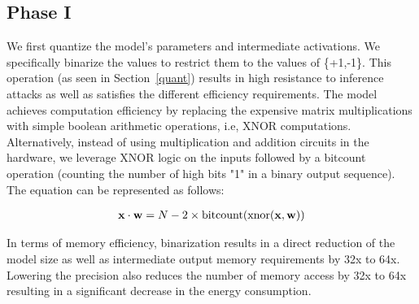 





\subsection{Phase I}
\label{p1}

We first quantize the model's parameters and intermediate activations. 
We specifically binarize the values to restrict them to the values of \{+1,-1\}.
This operation (as seen in Section~\ref{quant}) results in high resistance to inference attacks as well as satisfies the different efficiency requirements.
The model achieves computation efficiency by replacing the expensive matrix multiplications with simple boolean arithmetic operations, i.e, XNOR computations.
Alternatively, instead of using multiplication and addition circuits in the hardware, we leverage XNOR logic on the inputs followed by a bitcount operation (counting the number of high bits "1" in a binary output sequence).
The equation can be represented as follows:

\begin{align}
\footnotesize
\mathbf{x} \cdot \mathbf{w} =
N - 2\times\operatorname{bitcount}(\operatorname{xnor}(\mathbf{x}, \mathbf{w}))
\end{align}

In terms of memory efficiency, binarization results in a direct reduction of the model size as well as intermediate output memory requirements by 32x to 64x.
Lowering the precision also reduces the number of memory access by 32x to 64x resulting in a significant decrease in the energy consumption. %


